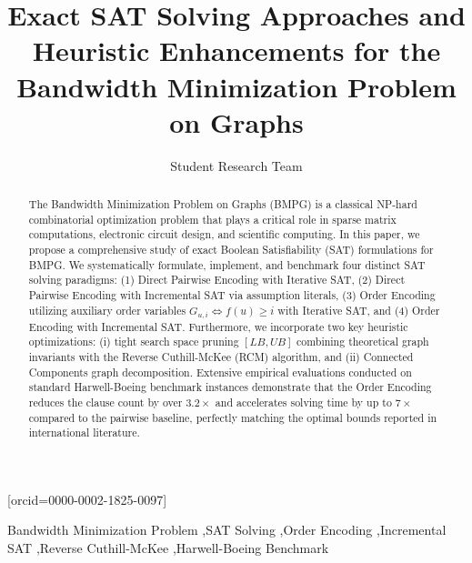 \documentclass[a4paper,fleqn]{cas-sc}
\begin{document}
\let\WriteBookmarks\relax
\def\floatpagepagefraction{1}
\def\textpagefraction{.001}


\title[mode = title]{Exact SAT Solving Approaches and Heuristic Enhancements for the Bandwidth Minimization Problem on Graphs}

\author[1]{Student Research Team}[orcid=0000-0002-1825-0097]
\cormark[1]
\address[1]{Faculty of Computer Science and Engineering, Vietnam National University}


\begin{abstract}
The Bandwidth Minimization Problem on Graphs (BMPG) is a classical NP-hard combinatorial optimization problem that plays a critical role in sparse matrix computations, electronic circuit design, and scientific computing. In this paper, we propose a comprehensive study of exact Boolean Satisfiability (SAT) formulations for BMPG. We systematically formulate, implement, and benchmark four distinct SAT solving paradigms: (1) Direct Pairwise Encoding with Iterative SAT, (2) Direct Pairwise Encoding with Incremental SAT via assumption literals, (3) Order Encoding utilizing auxiliary order variables $G_{u,i} \iff f(u) \ge i$ with Iterative SAT, and (4) Order Encoding with Incremental SAT. Furthermore, we incorporate two key heuristic optimizations: (i) tight search space pruning $[LB, UB]$ combining theoretical graph invariants with the Reverse Cuthill-McKee (RCM) algorithm, and (ii) Connected Components graph decomposition. Extensive empirical evaluations conducted on standard Harwell-Boeing benchmark instances demonstrate that the Order Encoding reduces the clause count by over $3.2\times$ and accelerates solving time by up to $7\times$ compared to the pairwise baseline, perfectly matching the optimal bounds reported in international literature.
\end{abstract}

\begin{keywords}
Bandwidth Minimization Problem \sep SAT Solving \sep Order Encoding \sep Incremental SAT \sep Reverse Cuthill-McKee \sep Harwell-Boeing Benchmark
\end{keywords}

\maketitle
\end{document}

